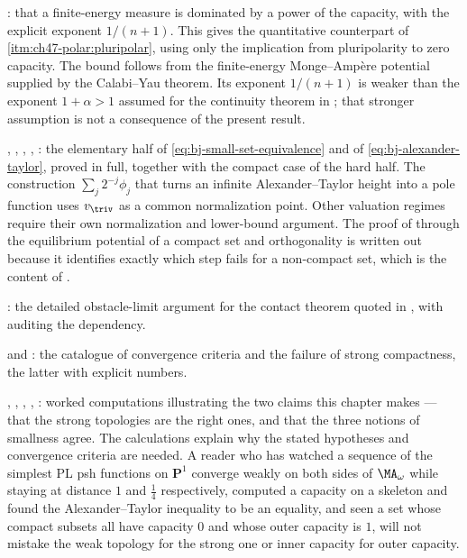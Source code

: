 : that a finite-energy measure is
dominated by a power of the capacity, with the explicit exponent
$1/(n+1)$.  This gives the quantitative counterpart of
\,\cref{itm:ch47-polar:pluripolar},
using only the implication from pluripolarity to zero capacity.
The bound follows from the finite-energy Monge--Amp\`ere potential
supplied by the Calabi--Yau theorem. Its exponent $1/(n+1)$ is weaker
than the exponent $1+\alpha>1$ assumed for the continuity theorem
in ; that stronger assumption
is not a consequence of the present result.

,
,
, ,
: the elementary half of
\eqref{eq:bj-small-set-equivalence} and of
\eqref{eq:bj-alexander-taylor}, proved in full, together with the compact
case of the hard half.  The construction $\sum_j2^{-j}\phi_j$ that turns
an infinite Alexander--Taylor height into a pole function uses
$v_{\triv}$ as a common normalization point. Other valuation regimes
require their own normalization and lower-bound argument.  The proof of
 through the equilibrium potential of a compact
set and orthogonality is written out because it identifies exactly which
step fails for a non-compact set, which is the content of
.

: the detailed obstacle-limit argument for the contact theorem
quoted in , with
 auditing the dependency.

 and : the
catalogue of convergence criteria and the failure of strong compactness,
the latter with explicit numbers.

,
,
,
,
: worked computations illustrating the two
claims this chapter makes --- that the strong topologies are the right
ones, and that the three notions of smallness agree. The calculations
explain why the stated hypotheses and convergence criteria are needed.  A
reader who has watched a sequence of the simplest PL psh functions on
$\mathbf P^1$ converge weakly on both sides of $\MA_\omega$ while
staying at distance $1$ and $\tfrac14$ respectively, computed a
capacity on a skeleton and found the Alexander--Taylor inequality to be an
equality, and seen a set whose compact subsets all have capacity $0$ and
whose outer capacity is $1$, will not mistake the weak topology for the
strong one or inner capacity for outer capacity.

